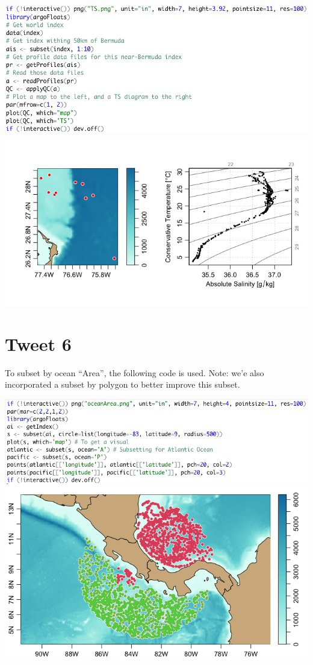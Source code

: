 \documentclass[
]{article}
\begin{document}
\includegraphics{../18_tweets/TScode.png}
\includegraphics{../18_tweets/TS.png}

\hypertarget{tweet-6}{%
\section{Tweet 6}\label{tweet-6}}

To subset by ocean ``Area'', the following code is used. Note: we'e also
incorporated a subset by polygon to better improve this subset.

\includegraphics{../18_tweets/oceanAreaCode.png}
\includegraphics{../18_tweets/oceanArea.png}
\end{document}

